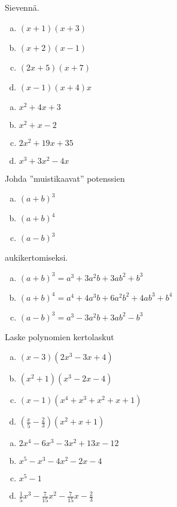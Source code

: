 \begin{tehtava}
    Sievennä.
    \begin{enumerate}[a)]
        \item $(x+1)(x+3)$
        \item $(x+2)(x-1)$
        \item $(2x+5)(x+7)$
        \item $(x-1)(x+4)x$
    \end{enumerate}
    \begin{vastaus}
        \begin{enumerate}[a)]
            \item $x^2 + 4x + 3$
            \item $x^2 + x - 2$
            \item $2x^2 + 19x + 35$
            \item $x^3 + 3x^2 - 4x$
        \end{enumerate}
    \end{vastaus}
\end{tehtava}

\begin{tehtava}
    Johda ''muistikaavat'' potenssien
    \begin{enumerate}[a)]
            \item $(a+b)^3$
            \item $(a+b)^4$
            \item $(a-b)^3$
        \end{enumerate}
        aukikertomiseksi.
    \begin{vastaus}
        \begin{enumerate}[a)]
            \item $(a+b)^3 = a^3 + 3a^2b + 3ab^2 + b^3$
            \item $(a+b)^4 = a^4 + 4a^3b + 6a^2b^2 + 4ab^3 + b^4$
            \item $(a-b)^3 = a^3 - 3a^2b + 3ab^2 - b^3$
        \end{enumerate}
    \end{vastaus}
\end{tehtava}

\begin{tehtava}
	Laske polynomien kertolaskut
	\begin{enumerate}[a)]
		\item $(x-3)(2x^3-3x+4)$
		\item $(x^2+1)(x^3-2x-4)$
		\item $(x-1)(x^4+x^3+x^2+x+1)$
		\item $(\frac x5-\frac23)(x^2+x+1)$
	\end{enumerate}
	\begin{vastaus}
		\begin{enumerate}[a)]
			\item $2x^4-6x^3-3x^2+13x-12$
			\item $x^5-x^3-4x^2-2x-4$
			\item $x^5-1$
			\item $\frac15x^3-\frac{7}{15}x^2-\frac{7}{15}x-\frac23$
		\end{enumerate}
	\end{vastaus}
\end{tehtava}

